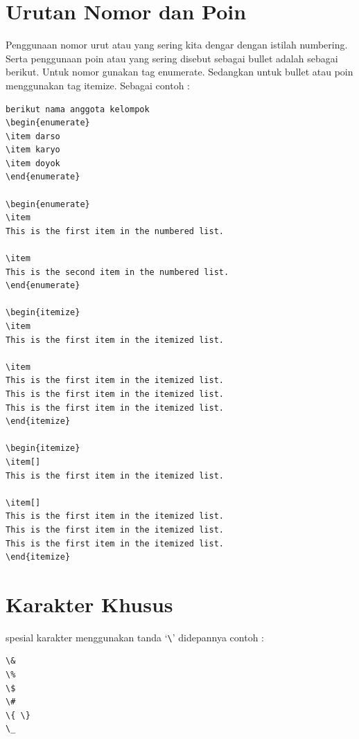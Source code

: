 \section{Urutan Nomor dan Poin}

Penggunaan nomor urut atau yang sering kita dengar dengan istilah numbering. Serta penggunaan poin atau yang sering disebut sebagai bullet adalah sebagai berikut. Untuk nomor gunakan tag enumerate. Sedangkan untuk bullet atau poin menggunakan tag itemize. Sebagai contoh :
\begin{verbatim}
berikut nama anggota kelompok
\begin{enumerate}
\item darso
\item karyo
\item doyok
\end{enumerate}

\begin{enumerate}
\item
This is the first item in the numbered list.

\item
This is the second item in the numbered list.
\end{enumerate}

\begin{itemize}
\item
This is the first item in the itemized list.

\item
This is the first item in the itemized list.
This is the first item in the itemized list.
This is the first item in the itemized list.
\end{itemize}

\begin{itemize}
\item[]
This is the first item in the itemized list.

\item[]
This is the first item in the itemized list.
This is the first item in the itemized list.
This is the first item in the itemized list.
\end{itemize}
\end{verbatim}
    
\section{Karakter Khusus}

spesial karakter menggunakan tanda `\verb|\|' didepannya contoh :
\begin{verbatim}
\& 
\% 
\$ 
\#  
\{ \}
\_
\end{verbatim}

